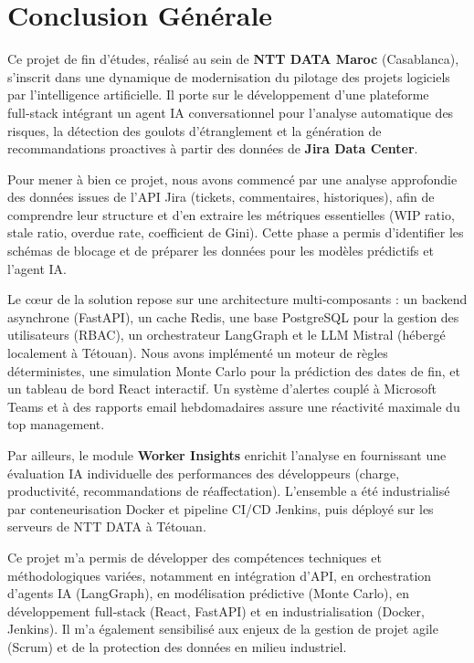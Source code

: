 \chapter*{Conclusion Générale}

Ce projet de fin d’études, réalisé au sein de \textbf{NTT DATA Maroc} (Casablanca), s’inscrit dans une dynamique de modernisation du pilotage des projets logiciels par l’intelligence artificielle. Il porte sur le développement d’une plateforme full‑stack intégrant un agent IA conversationnel pour l’analyse automatique des risques, la détection des goulots d’étranglement et la génération de recommandations proactives à partir des données de \textbf{Jira Data Center}.

Pour mener à bien ce projet, nous avons commencé par une analyse approfondie des données issues de l’API Jira (tickets, commentaires, historiques), afin de comprendre leur structure et d’en extraire les métriques essentielles (WIP ratio, stale ratio, overdue rate, coefficient de Gini). Cette phase a permis d’identifier les schémas de blocage et de préparer les données pour les modèles prédictifs et l’agent IA.

Le cœur de la solution repose sur une architecture multi‑composants : un backend asynchrone (FastAPI), un cache Redis, une base PostgreSQL pour la gestion des utilisateurs (RBAC), un orchestrateur LangGraph et le LLM Mistral (hébergé localement à Tétouan). Nous avons implémenté un moteur de règles déterministes, une simulation Monte Carlo pour la prédiction des dates de fin, et un tableau de bord React interactif. Un système d’alertes couplé à Microsoft Teams et à des rapports email hebdomadaires assure une réactivité maximale du top management.

Par ailleurs, le module \textbf{Worker Insights} enrichit l’analyse en fournissant une évaluation IA individuelle des performances des développeurs (charge, productivité, recommandations de réaffectation). L’ensemble a été industrialisé par conteneurisation Docker et pipeline CI/CD Jenkins, puis déployé sur les serveurs de NTT DATA à Tétouan.

Ce projet m’a permis de développer des compétences techniques et méthodologiques variées, notamment en intégration d’API, en orchestration d’agents IA (LangGraph), en modélisation prédictive (Monte Carlo), en développement full‑stack (React, FastAPI) et en industrialisation (Docker, Jenkins). Il m’a également sensibilisé aux enjeux de la gestion de projet agile (Scrum) et de la protection des données en milieu industriel.

